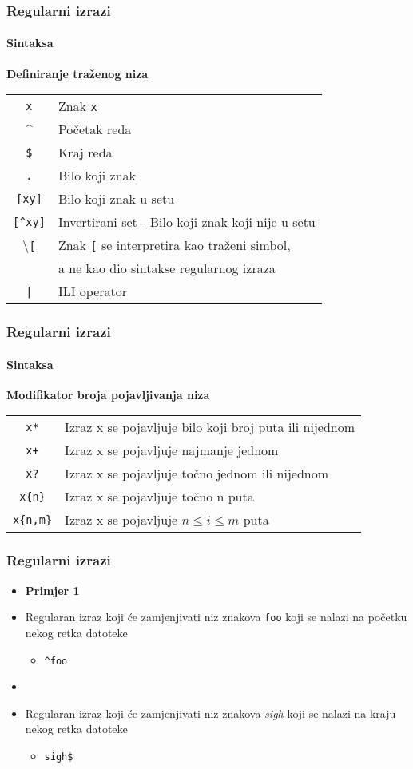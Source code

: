 \documentclass[table,usenames,dvipsnames]{beamer}
\newcommand{\shell}[1]{\texttt{#1}}
\begin{document}
\begin{frame}[t]
\frametitle{Regularni izrazi}
\framesubtitle{Sintaksa}
\textbf{Definiranje traženog niza}
\begin{table}[h]
\begin{tabular}{c l}
  \shell{x} & Znak \shell{x}\\
  \textasciicircum{} & Početak reda \\
  \shell{\$} & Kraj reda \\
  \shell{.} & Bilo koji znak \\
  \shell{[xy]} & Bilo koji znak u setu \\
  \shell{[\textasciicircum{}xy]} &  Invertirani set - Bilo koji znak koji nije u setu \\
  \textbackslash{}\shell{[} & Znak \shell{[} se interpretira kao traženi simbol, \\
  & a ne kao dio sintakse regularnog izraza \\
  \shell{|} & ILI operator \\
\end{tabular}
\end{table}
\end{frame}

\begin{frame}[t]
\frametitle{Regularni izrazi}
\framesubtitle{Sintaksa}
\textbf{Modifikator broja pojavljivanja niza}
\begin{table}[h]
\begin{tabular}{c l}
  \shell{x*} & Izraz x se pojavljuje bilo koji broj puta ili nijednom\\
  \shell{x+} & Izraz x se pojavljuje najmanje jednom \\
  \shell{x?} & Izraz x se pojavljuje točno jednom ili nijednom \\
  \shell{x\{n\}} & Izraz x se pojavljuje točno n puta \\
  \shell{x\{n,m\}} & Izraz x se pojavljuje $n \le i \le m$ puta
\end{tabular}
\end{table}
\end{frame}
  
\begin{frame}[t]
\frametitle{Regularni izrazi}
\begin{itemize}
  \item \textbf{Primjer 1}
  \item[] Regularan izraz koji će zamjenjivati niz znakova \shell{foo} koji se nalazi na početku nekog retka datoteke
  \begin{itemize}
    \item[] \shell{\textasciicircum{}foo}
  \end{itemize}
  \item[]
  \item[] Regularan izraz koji će zamjenjivati niz znakova \emph{sigh}
        koji se nalazi na kraju nekog retka datoteke
  \begin{itemize}
    \item[] \shell{sigh\$}
  \end{itemize}
\end{itemize}
\end{frame}
\end{document}
